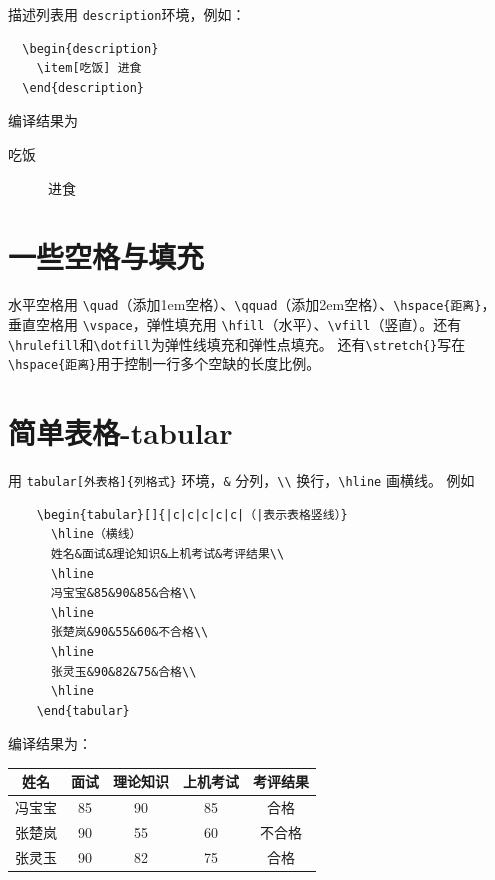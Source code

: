 \documentclass[12pt,a4paper]{ctexart}
\begin{document}
描述列表用 \verb|description|环境，例如：
\begin{verbatim}
  \begin{description}
    \item[吃饭] 进食
  \end{description}
\end{verbatim}
编译结果为
\begin{description}
  \item[吃饭] 进食
\end{description}


\section{一些空格与填充}
水平空格用 \verb|\quad|（添加1em空格）、\verb|\qquad|（添加2em空格）、\verb|\hspace{距离}|，
垂直空格用 \verb|\vspace|，弹性填充用 \verb|\hfill|（水平）、\verb|\vfill|（竖直）。还有\verb|\hrulefill|和\verb|\dotfill|为弹性线填充和弹性点填充。
还有\verb|\stretch{}|写在\verb|\hspace{距离}|用于控制一行多个空缺的长度比例。


\section{简单表格-tabular}
用 \verb|tabular[外表格]{列格式}| 环境，\verb|&| 分列，\verb|\\| 换行，\verb|\hline| 画横线。
例如
\begin{center}
  \begin{verbatim}
    \begin{tabular}[]{|c|c|c|c|c|（|表示表格竖线）}
      \hline（横线）
      姓名&面试&理论知识&上机考试&考评结果\\
      \hline
      冯宝宝&85&90&85&合格\\
      \hline
      张楚岚&90&55&60&不合格\\
      \hline
      张灵玉&90&82&75&合格\\
      \hline
    \end{tabular}
  \end{verbatim}
\end{center}
编译结果为：
\begin{center}
  \begin{tabular}[]{|c|c|c|c|c|}
    \hline
    姓名&面试&理论知识&上机考试&考评结果\\
    \hline
    冯宝宝&85&90&85&合格\\
    \hline
    张楚岚&90&55&60&不合格\\
    \hline
    张灵玉&90&82&75&合格\\
    \hline
  \end{tabular}
\end{center}
\end{document}
